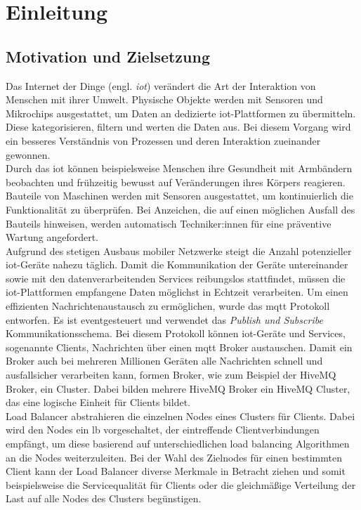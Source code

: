 \section{Einleitung}
\subsection{Motivation und Zielsetzung}
Das Internet der Dinge (engl. \textit{\acf{iot}}) verändert die Art der Interaktion von Menschen mit ihrer Umwelt. Physische Objekte werden mit Sensoren und Mikrochips ausgestattet, um Daten an dedizierte \ac{iot}-Plattformen zu übermitteln. Diese kategorisieren, filtern und werten die Daten aus. Bei diesem Vorgang wird ein besseres Verständnis von Prozessen und deren Interaktion zueinander gewonnen.
\\
Durch das \acl{iot} können beispielsweise Menschen ihre Gesundheit mit Armbändern beobachten und frühzeitig bewusst auf Veränderungen ihres Körpers reagieren. Bauteile von Maschinen werden mit Sensoren ausgestattet, um kontinuierlich die Funktionalität zu überprüfen. Bei Anzeichen, die auf einen möglichen Ausfall des Bauteils hinweisen, werden automatisch Techniker:innen für eine präventive Wartung angefordert.
\\
Aufgrund des stetigen Ausbaus mobiler Netzwerke steigt die Anzahl potenzieller \ac{iot}-Geräte nahezu täglich. Damit die Kommunikation der Geräte untereinander sowie mit den datenverarbeitenden Services reibungslos stattfindet, müssen die \ac{iot}-Plattformen empfangene Daten möglichst in Echtzeit verarbeiten.
Um einen effizienten Nachrichtenaustausch zu ermöglichen, wurde das \ac{mqtt} Protokoll entworfen.
Es ist eventgesteuert und verwendet das \textit{Publish und Subscribe} Kommunikationsschema.
Bei diesem Protokoll können \ac{iot}-Geräte und Services, sogenannte Clients, Nachrichten über einen \ac{mqtt} Broker austauschen.
Damit ein Broker auch bei mehreren Millionen Geräten alle Nachrichten schnell und ausfallsicher verarbeiten kann, formen Broker, wie zum Beispiel der HiveMQ Broker, ein Cluster. Dabei bilden mehrere HiveMQ Broker ein HiveMQ Cluster, das eine logische Einheit für Clients bildet.
\\
Load Balancer abstrahieren die einzelnen Nodes eines Clusters für Clients.
Dabei wird den Nodes ein \acl{lb} vorgeschaltet, der eintreffende Clientverbindungen empfängt, um diese basierend auf unterschiedlichen load balancing Algorithmen an die Nodes weiterzuleiten.
Bei der Wahl des Zielnodes für einen bestimmten Client kann der Load Balancer diverse Merkmale in Betracht ziehen und somit beispielsweise die Servicequalität für Clients oder die gleichmä{\ss}ige Verteilung der Last auf alle Nodes des Clusters begünstigen.
